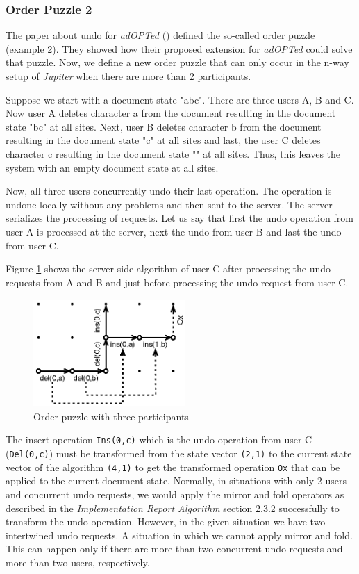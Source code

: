\subsubsection{Order Puzzle 2}
The paper about undo for \emph{adOPTed} (\cite{ressel99}) defined
the so-called order puzzle (example 2). They showed how their proposed
extension for \emph{adOPTed} could solve that puzzle. Now, we define
a new order puzzle that can only occur in the n-way setup of \emph{Jupiter}
when there are more than 2 participants.

Suppose we start with a document state "abc". There are three users A, B and C. Now user A deletes
character a from the document resulting in the document state "bc" at all sites.
Next, user B deletes character b from the document resulting in the document state "c" at all sites and last, the user C deletes character c resulting in the document state "" at all sites. Thus, this leaves the system with an empty document state at all sites.

Now, all three users concurrently undo their last operation. The operation is undone locally without any problems and then sent to the server. The server serializes the processing of requests.
Let us say that first the undo operation from user A is processed at the server, next
the undo from user B and last the undo from user C.

Figure \ref{fig:algorithm.undoredopuzzle} shows the server side
algorithm of user C after processing the undo requests from A and B and just
before processing the undo request from user C.

\begin{figure}[H]
 \centering
 \includegraphics[width=5.79cm,height=4.10cm]{../images/finalreport/algorithm_undopuzzle.eps}
 \caption{Order puzzle with three participants}
 \label{fig:algorithm.undoredopuzzle}
\end{figure}

The insert operation \texttt{Ins(0,c)} which is the undo operation from user C (\texttt{Del(0,c)}) must be transformed from the state
vector \texttt{(2,1)} to the current state vector of the algorithm
\texttt{(4,1)} to get the transformed operation \texttt{Ox} that can
be applied to the current document state. 
Normally, in situations with only 2 users and concurrent undo
requests, we would apply the mirror and fold operators as described
in the \emph{Implementation Report Algorithm} section 2.3.2 successfully to transform the undo operation. However, in the given situation we have two intertwined undo requests. A
situation in which we cannot apply mirror and fold. This can happen only
if there are more than two concurrent undo requests and more than two users, respectively.

